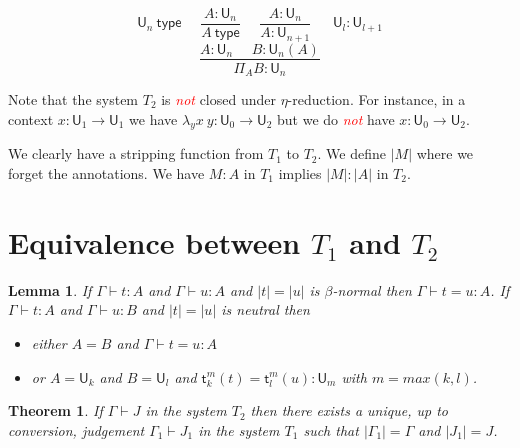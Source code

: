 \documentclass[11pt,a4paper]{article}
\newtheorem{theorem}{Theorem}[section]
\newtheorem{lemma}{Lemma}[theorem]
\theoremstyle{definition}
\def\UU{\mathsf{U}}
\newcommand{\type}{\mathsf{type}}
\newcommand{\sT}{\mathsf{t}}
\newcommand{\EMP}[1]{\emph{\textcolor{red}{#1}}}
\begin{document}
$$
\UU_n~\type~~~~~~
\frac{A:\UU_{n}}{A~\type}
~~~~~~\frac{A:\UU_{n}}{A:\UU_{n+1}}
~~~~~~~
{\UU_l}:\UU_{l+1}
$$
$$
\frac{A:\UU_{n}~~~~~~B:\UU_n(A)}
     {\Pi_AB:\UU_{n}}$$

\medskip


     Note that the system $T_2$ is \EMP{not} closed under $\eta$-reduction. For instance, in a context
     $x:\UU_1\rightarrow\UU_1$ we have $\lambda_yx~y:\UU_0\rightarrow\UU_2$ but we do \EMP{not} have
     $x:\UU_0\rightarrow\UU_2$.


\medskip


We clearly have a stripping function from $T_1$ to $T_2$. We define $|M|$ where we forget the annotations.
We have $M:A$ in $T_1$ implies $|M|:|A|$ in $T_2$.

\section{Equivalence between $T_1$ and $T_2$}

\begin{lemma}
  If $\Gamma\vdash t:A$ and $\Gamma\vdash u:A$ and $|t| = |u|$ is $\beta$-normal then $\Gamma\vdash t = u:A$.
  If $\Gamma\vdash t:A$ and $\Gamma\vdash u:B$ and $|t| = |u|$ is neutral then
  \begin{itemize}
    \item either $A = B$
      and $\Gamma\vdash t = u:A$
    \item or $A = \UU_k$ and $B = \UU_l$ and $\sT_k^m(t) = \sT_l^m(u):\UU_m$ with $m = max(k,l)$.
  \end{itemize}
\end{lemma}

\begin{theorem}
  If $\Gamma\vdash J$ in the system $T_2$ then there exists a unique, up to conversion, judgement $\Gamma_1\vdash J_1$
  in the system $T_1$ such that $|\Gamma_1| = \Gamma$ and $|J_1| = J$.
\end{theorem}







\end{document}
